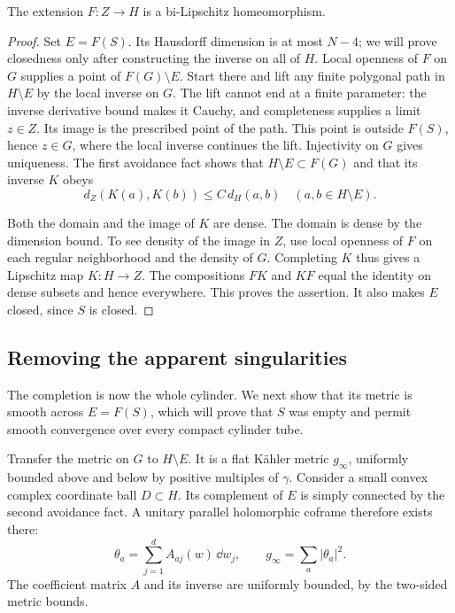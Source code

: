 \begin{lemma}\label{lem:full-cylinder}
The extension $F:Z\to H$ is a bi-Lipschitz homeomorphism.
\end{lemma}
\begin{proof}
Set $E=F(S)$. Its Hausdorff dimension is at most $N-4$; we will prove
closedness only after constructing the inverse on all of $H$.
Local openness of $F$ on $G$ supplies a point of $F(G)\setminus E$.
Start there and lift any finite polygonal path in $H\setminus E$
by the local inverse on $G$. The lift cannot end at a finite
parameter: the inverse derivative bound makes it Cauchy, and
completeness supplies a limit $z\in Z$. Its image is the prescribed
point of the path. This point is outside $F(S)$, hence $z\in G$,
where the local inverse continues the lift. Injectivity on $G$
gives uniqueness. The first avoidance fact shows that
$H\setminus E\subset F(G)$ and that its inverse $K$ obeys
\[
       d_Z(K(a),K(b))\le C\,d_H(a,b)
           \quad(a,b\in H\setminus E).
\]

Both the domain and the image of $K$ are dense. The domain is
dense by the dimension bound. To see density of the image in
$Z$, use local openness of $F$ on each regular neighborhood and
the density of $G$. Completing $K$ thus gives a Lipschitz map
$K:H\to Z$. The compositions $FK$ and $KF$ equal the identity on
dense subsets and hence everywhere. This proves the assertion.
It also makes $E$ closed, since $S$ is closed.
\end{proof}

\subsection{Removing the apparent singularities}

The completion is now the whole cylinder.  We next show that its metric
is smooth across $E=F(S)$, which will prove that $S$ was empty and permit
smooth convergence over every compact cylinder tube.

Transfer the metric on $G$ to $H\setminus E$. It is a flat
K\"ahler metric $g_\infty$, uniformly bounded above and below by
positive multiples of $\gamma$. Consider a small convex complex
coordinate ball $D\subset H$. Its complement of $E$ is simply
connected by the second avoidance fact. A unitary parallel
holomorphic coframe therefore exists there:
\[
     \theta_a=\sum_{j=1}^d A_{aj}(w)\,\dd w_j,\qquad
                g_\infty=\sum_a|\theta_a|^2.
\]
The coefficient matrix $A$ and its inverse are uniformly bounded,
by the two-sided metric bounds.

